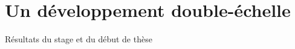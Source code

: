 \chapter{Un développement double-échelle}
\label{chap:two-scale}

Résultats du stage et du début de thèse